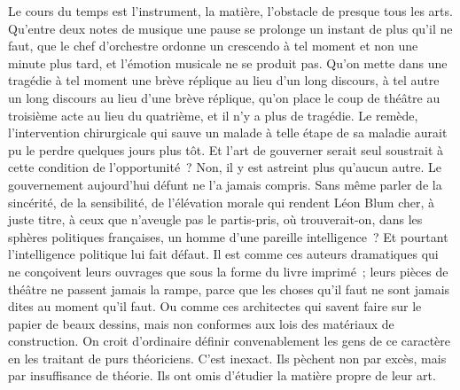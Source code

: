 \documentclass[french,twoside]{book} %
\begin{document}
Le cours du temps est l'instrument, la matière, l'obstacle de presque tous les arts. Qu'entre deux notes de musique une pause se prolonge un instant de plus qu'il ne faut, que le chef d'orchestre ordonne un crescendo à tel moment et non une minute plus tard, et l'émotion musicale ne se produit pas. Qu'on mette dans une tragédie à tel moment une brève réplique au lieu d'un long discours, à tel autre un long discours au lieu d'une brève réplique, qu'on place le coup de théâtre au troisième acte au lieu du quatrième, et il n'y a plus de tragédie. Le remède, l'intervention chirurgicale qui sauve un malade à telle étape de sa maladie aurait pu le perdre quelques jours plus tôt. Et l'art de gouverner serait seul soustrait à cette condition de l'opportunité ? Non, il y est astreint plus qu'aucun autre. Le gouvernement aujourd'hui défunt ne l'a jamais compris. Sans même parler de la sincérité, de la sensibilité, de l'élévation morale qui rendent Léon Blum cher, à juste titre, à ceux que n'aveugle pas le partis-pris, où trouverait-on, dans les sphères politiques françaises, un homme d'une pareille intelligence ? Et pourtant l'intelligence politique lui fait défaut. Il est comme ces auteurs dramatiques qui ne conçoivent leurs ouvrages que sous la forme du livre imprimé ; leurs pièces de théâtre ne passent jamais la rampe, parce que les choses qu'il faut ne sont jamais dites au moment qu'il faut. Ou comme ces architectes qui savent faire sur le papier de beaux dessins, mais non conformes aux lois des matériaux de construction. On croit d'ordinaire définir convenablement les gens de ce caractère en les traitant de purs théoriciens. C'est inexact. Ils pèchent non par excès, mais par insuffi­sance de théorie. Ils ont omis d'étudier la matière propre de leur art.\par
\end{document}
